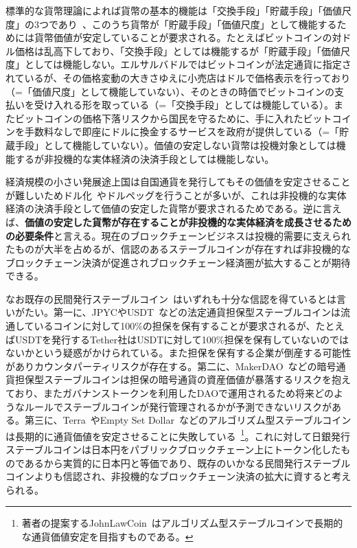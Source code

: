 \documentclass[dvipdfmx,a4paper]{jsarticle}
\begin{document}
標準的な貨幣理論によれば貨幣の基本的機能は「交換手段」「貯蔵手段」「価値尺度」の3つであり~\cite{davies2010history}、このうち貨幣が「貯蔵手段」「価値尺度」として機能するためには貨幣価値が安定していることが要求される。たとえばビットコインの対ドル価格は乱高下しており、「交換手段」としては機能するが「貯蔵手段」「価値尺度」としては機能しない。エルサルバドルではビットコインが法定通貨に指定されているが、その価格変動の大きさゆえに小売店はドルで価格表示を行っており（=「価値尺度」として機能していない）、そのときの時価でビットコインの支払いを受け入れる形を取っている（=「交換手段」としては機能している）。またビットコインの価格下落リスクから国民を守るために、手に入れたビットコインを手数料なしで即座にドルに換金するサービスを政府が提供している（=「貯蔵手段」として機能していない）。価値の安定しない貨幣は投機対象としては機能するが非投機的な実体経済の決済手段としては機能しない。

経済規模の小さい発展途上国は自国通貨を発行してもその価値を安定させることが難しいためドル化~\cite{calvo2002dollarization,selgin2005currency}やドルペッグを行うことが多いが、これは非投機的な実体経済の決済手段として価値の安定した貨幣が要求されるためである。逆に言えば、\textbf{価値の安定した貨幣が存在することが非投機的な実体経済を成長させるための必要条件}と言える。現在のブロックチェーンビジネスは投機的需要に支えられたものが大半を占めるが、信認のあるステーブルコインが存在すれば非投機的なブロックチェーン決済が促進されブロックチェーン経済圏が拡大することが期待できる。

なお既存の民間発行ステーブルコイン~\cite{arner2020stablecoins,moin2020sok}はいずれも十分な信認を得ているとは言いがたい。第一に、JPYCやUSDT~\cite{tether}などの法定通貨担保型ステーブルコインは流通しているコインに対して100\%の担保を保有することが要求されるが、たとえばUSDTを発行するTether社はUSDTに対して100\%担保を保有していないのではないかという疑惑がかけられている。また担保を保有する企業が倒産する可能性がありカウンタパーティリスクが存在する。第二に、MakerDAO~\cite{makerdao}などの暗号通貨担保型ステーブルコインは担保の暗号通貨の資産価値が暴落するリスクを抱えており、またガバナンストークンを利用したDAOで運用されるため将来どのようなルールでステーブルコインが発行管理されるかが予測できないリスクがある。第三に、Terra~\cite{terra}やEmpty Set Dollar~\cite{emptysetdollar}などのアルゴリズム型ステーブルコインは長期的に通貨価値を安定させることに失敗している~\footnote{著者の提案するJohnLawCoin~\cite{johnlawcoin}はアルゴリズム型ステーブルコインで長期的な通貨価値安定を目指すものである。}。これに対して日銀発行ステーブルコインは日本円をパブリックブロックチェーン上にトークン化したものであるから実質的に日本円と等価であり、既存のいかなる民間発行ステーブルコインよりも信認され、非投機的なブロックチェーン決済の拡大に資すると考えられる。
\end{document}
